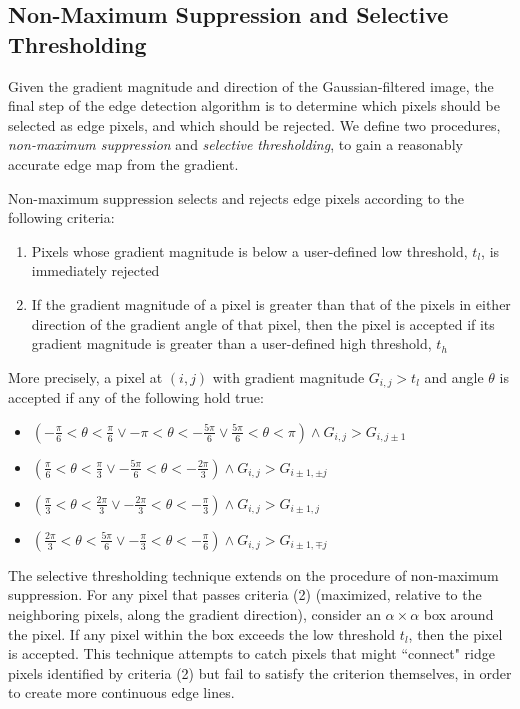 \documentclass[journal]{IEEEtran}
\begin{document}
\subsection{Non-Maximum Suppression and Selective Thresholding}
Given the gradient magnitude and direction of the Gaussian-filtered image, the final step of the edge detection algorithm is to determine which pixels should be selected as edge pixels, and which should be rejected. We define two procedures, \textit{non-maximum suppression} and \textit{selective thresholding}, to gain a reasonably accurate edge map from the gradient.
\par Non-maximum suppression selects and rejects edge pixels according to the following criteria:
\begin{enumerate}
	\item Pixels whose gradient magnitude is below a user-defined low threshold, $t_l$, is immediately rejected
	\item If the gradient magnitude of a pixel is greater than that of the pixels in either direction of the gradient angle of that pixel, then the pixel is accepted if its gradient magnitude is greater than a user-defined high threshold, $t_h$
\end{enumerate}
More precisely, a pixel at $(i, j)$ with gradient magnitude $G_{i, j} > t_l$ and angle $\theta$ is accepted if any of the following hold true:
\begin{itemize}
	\item $(-\frac{\pi}{6} < \theta < \frac{\pi}{6} \vee -\pi < \theta < -\frac{5 \pi}{6} \vee \frac{5\pi}{6} < \theta < \pi) \wedge G_{i, j} > G_{i, j \pm 1}$
	\item $(\frac{\pi}{6} < \theta < \frac{\pi}{3} \vee -\frac{5 \pi}{6} < \theta < -\frac{2 \pi}{3}) \wedge G_{i, j} > G_{i \pm 1, \pm j}$
	\item $(\frac{\pi}{3} < \theta < \frac{2 \pi}{3} \vee -\frac{2 \pi}{3} < \theta < -\frac{\pi}{3}) \wedge G_{i, j} > G_{i \pm 1, j}$
	\item $(\frac{2 \pi}{3} < \theta < \frac{5 \pi}{6} \vee -\frac{\pi}{3} < \theta < -\frac{\pi}{6}) \wedge G_{i, j} > G_{i \pm 1, \mp j}$
\end{itemize}
\par The selective thresholding technique extends on the procedure of non-maximum suppression. For any pixel that passes criteria (2) (maximized, relative to the neighboring pixels, along the gradient direction), consider an $\alpha \times \alpha$ box around the pixel. If any pixel within the box exceeds the low threshold $t_l$, then the pixel is accepted. This technique attempts to catch pixels that might ``connect" ridge pixels identified by criteria (2) but fail to satisfy the criterion themselves, in order to create more continuous edge lines.
\end{document}
